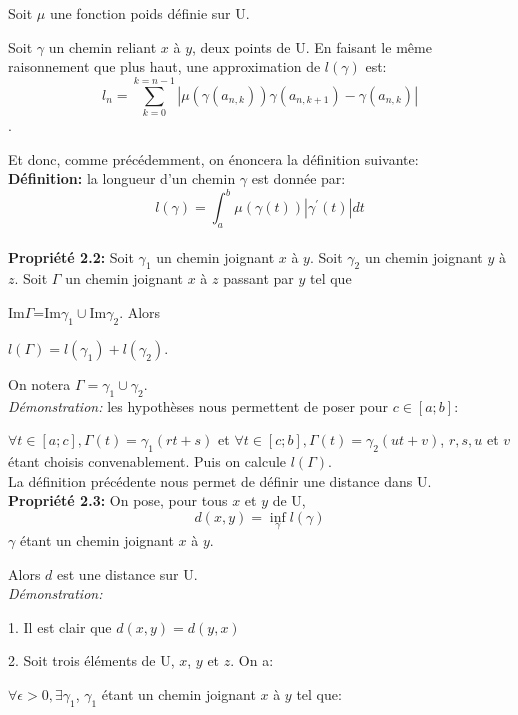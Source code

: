 \documentclass[a4paper, 12pt, twoside]{book}
\begin{document}
  Soit $\mu$ une fonction poids définie sur U.\
  
  Soit $\gamma$ un chemin reliant $x$ à $y$, deux points de U. En faisant le même raisonnement que plus haut, une approximation de $l(\gamma)$ est:\\
  
   
  $$l_{n}=\sum_{k=0}^{k=n-1}|\mu(\gamma(a_{n,k}))\gamma(a_{n,k+1})-\gamma(a_{n,k})|$$.\
  
  Et donc, comme précédemment, on énoncera la définition suivante:\\
  
  \textbf{Définition:} la longueur d'un chemin $\gamma$ est donnée par:
 $$l(\gamma)=\int_{a}^{b}  \mu(\gamma(t))|\gamma^{'}(t)|dt$$\\
 
 \textbf{Propriété 2.2:} Soit  $\gamma_{1}$  un chemin joignant $x$ à $y$. Soit  $\gamma_{2}$  un chemin joignant $y$ à $z$. Soit  $\Gamma$  un chemin joignant $x$ à $z$ passant par $y$ tel que\
 
  Im$\Gamma$=Im$\gamma_{1}\cup$Im$\gamma_{2} $. Alors \
  
  $l(\Gamma)=l(\gamma_{1})+l(\gamma_{2})$.\
  
  On notera  $\Gamma=\gamma_{1}\cup\gamma_{2} $. \\
  
 \textit{Démonstration:} les hypothèses nous permettent de poser pour $c\in [a; b]$:\
 
 $ \forall t\in [a; c], \Gamma(t)=\gamma_{1}(rt+s)$ et 
 $ \forall t\in [c; b], \Gamma(t)=\gamma_{2}(ut+v)$, $r, s, u$ et $v$ étant choisis convenablement. Puis on calcule $l(\Gamma)$.\\
 
 
 
 La définition précédente nous permet de définir une distance dans U.\\
 
 
 \textbf{Propriété 2.3:} On pose, pour tous $x$ et $y$ de U, $$d(x, y)=\inf_{\gamma}l(\gamma)$$  $\gamma$ étant un chemin joignant $x$ à $y$.\
 
 Alors $d$ est une distance sur U. \\
 
 
 \textit{Démonstration:}\
 
 
  1. Il est clair que $d(x, y)=d(y, x)$\
  
  2. Soit trois éléments de U, $x$, $y$ et $z$. On a:\
  
 $\forall \epsilon>0, \exists \gamma_{1}$,  $\gamma_{1}$ étant un chemin joignant $x$ à $y$ tel que:\
 
\end{document}
